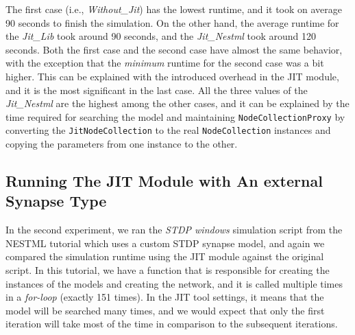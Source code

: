 The first case (i.e., \emph{Without\_Jit}) has the lowest runtime, and it took on average 90 seconds to finish the simulation. On the other hand, the average runtime for the \emph{Jit\_Lib} took around 90 seconds, and the \emph{Jit\_Nestml} took around 120 seconds.  Both the first case and the second case have almost the same behavior, with the exception that the \emph{minimum} runtime for the second case was a bit higher. This can be explained with the introduced overhead in the JIT module, and it is the most significant in the last case. All the three values of the \emph{Jit\_Nestml} are the highest among the other cases, and it can be explained by the time required for searching the model and maintaining \texttt{NodeCollectionProxy} by converting the \texttt{JitNodeCollection} to the real \texttt{NodeCollection} instances and copying the parameters from one instance to the other.


\subsection*{Running The JIT Module with An external Synapse Type}

In the second experiment, we ran the \emph{STDP windows} simulation script from the NESTML tutorial which uses a custom STDP synapse model, and again we compared the simulation runtime using the JIT module against the original script. In this tutorial, we have a function that is responsible for creating the instances of the models and creating the network, and it is called multiple times in a \emph{for-loop} (exactly 151 times). In the JIT tool settings, it means that the model will be searched many times, and we would expect that only the first iteration will take most of the time in comparison to the subsequent iterations. 

